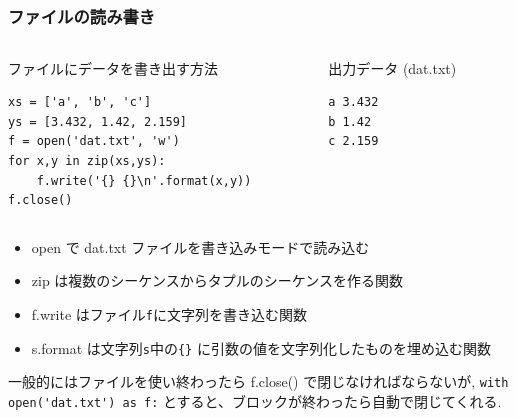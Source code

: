 \subsection*{\redm\whitem\greenb}
\begin{frame}[t,fragile]
\frametitle{ファイルの読み書き}
\begin{columns}
\begin{column}{8cm}
ファイルにデータを書き出す方法
\begin{lstlisting}
xs = ['a', 'b', 'c']
ys = [3.432, 1.42, 2.159]
f = open('dat.txt', 'w')
for x,y in zip(xs,ys):
    f.write('{} {}\n'.format(x,y))
f.close()
\end{lstlisting}
\end{column}
\begin{column}{4cm}
出力データ (dat.txt)
\begin{lstlisting}
a 3.432
b 1.42
c 2.159
\end{lstlisting}
\end{column}
\end{columns}

\begin{itemize}
\item open で dat.txt ファイルを書き込みモードで読み込む
\item zip は複数のシーケンスからタプルのシーケンスを作る関数
\item f.write はファイル\verb|f|に文字列を書き込む関数
\item s.format は文字列\verb|s|中の\verb|{}| に引数の値を文字列化したものを埋め込む関数
\end{itemize}
 一般的にはファイルを使い終わったら f.close() で閉じなければならないが,
 \verb|with open('dat.txt') as f:| とすると、ブロックが終わったら自動で閉じてくれる.
\end{frame}


